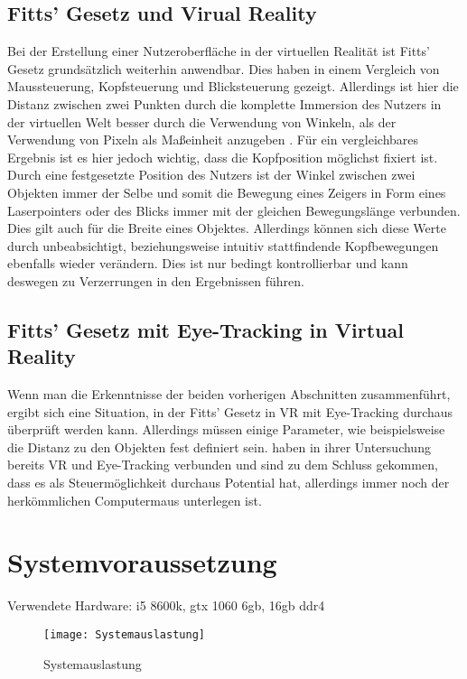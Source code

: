 \subsection{Fitts' Gesetz und Virual Reality}
Bei der Erstellung einer Nutzeroberfläche in der virtuellen Realität ist Fitts' Gesetz grundsätzlich weiterhin anwendbar. Dies haben \citeauthor{Hansen.2018} in einem Vergleich von Maussteuerung, Kopfsteuerung und Blicksteuerung gezeigt.\cite{Hansen.2018} Allerdings ist hier die Distanz zwischen zwei Punkten durch die komplette Immersion des Nutzers in der virtuellen Welt besser durch die Verwendung von Winkeln, als der Verwendung von Pixeln als Maßeinheit anzugeben \cite{Hansen.2018}. Für ein vergleichbares Ergebnis ist es hier jedoch wichtig, dass die Kopfposition möglichst fixiert ist. Durch eine festgesetzte Position des Nutzers ist der Winkel zwischen zwei Objekten immer der Selbe und somit die Bewegung eines Zeigers in Form eines Laserpointers oder des Blicks immer mit der gleichen Bewegungslänge verbunden. Dies gilt auch für die Breite eines Objektes. Allerdings können sich diese Werte durch unbeabsichtigt, beziehungsweise intuitiv stattfindende Kopfbewegungen ebenfalls wieder verändern. Dies ist nur bedingt kontrollierbar und kann deswegen zu Verzerrungen in den Ergebnissen führen. 

\subsection{Fitts' Gesetz mit Eye-Tracking in Virtual Reality}
Wenn man die Erkenntnisse der beiden vorherigen Abschnitten zusammenführt, ergibt sich eine Situation, in der Fitts' Gesetz in VR mit Eye-Tracking durchaus überprüft werden kann. Allerdings müssen einige Parameter, wie beispielsweise die Distanz zu den Objekten fest definiert sein. \citeauthor{Hansen.2018} haben in ihrer Untersuchung bereits VR und Eye-Tracking verbunden und sind zu dem Schluss gekommen, dass es als Steuermöglichkeit durchaus Potential hat, allerdings immer noch der herkömmlichen Computermaus unterlegen ist. \cite{Hansen.2018}

\section{Systemvoraussetzung}

Verwendete Hardware: i5 8600k, gtx 1060 6gb, 16gb ddr4

\begin{figure}[!htbp]
	\centering
	\texttt{[image: Systemauslastung]}
	\caption[Systemauslastung]{Systemauslastung}
	\label{fig:Systemauslastung}
\end{figure}